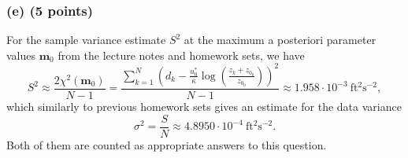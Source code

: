 \documentclass[11pt]{article}
\begin{document}
\subsubsection*{(e) (5 points)}

For the sample variance estimate $S^2$ at the maximum a posteriori parameter values $\mathbf{m}_0$ from the lecture notes and homework sets, we have
\begin{equation}
S^2 \approx \frac{2\chi^2(\mathbf{m}_0)}{N-1} = \frac{\sum_{k=1}^N(d_k - \frac{u^*_0}{\kappa} \log \left( \frac{z_k+z_{0_0}}{z_{0_0}} \right))^2}{N-1} \approx 1.958\cdot 10^{-3}~\mathrm{ft^2 s^{-2}}, 
\end{equation}
which similarly to previous homework sets gives an estimate for the data variance
\begin{equation}
\sigma^2 = \frac{S}{N} \approx 4.8950\cdot 10^{-4}~\mathrm{ft^2 s^{-2}}.
\end{equation}
Both of them are counted as appropriate answers to this question.
\end{document}
